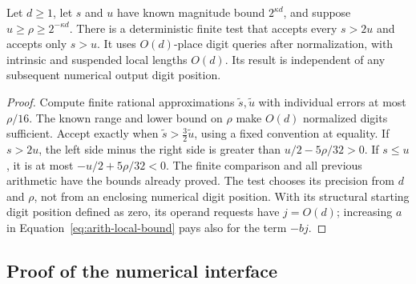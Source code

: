 \begin{lemma}
\label{lem:arith-buffered-test}
Let $d\geq1$, let $s$ and $u$ have known magnitude bound $2^{\kappa d}$,
and suppose $u\geq\rho\geq2^{-\kappa d}$.  There is a deterministic
finite test that accepts every $s>2u$ and accepts only $s>u$.
It uses $O(d)$-place digit queries after normalization, with
intrinsic and suspended local lengths $O(d)$.  Its result is
independent of any subsequent numerical output digit position.
\end{lemma}

\begin{proof}
Compute finite rational approximations $\widetilde s,\widetilde u$
with individual errors at most $\rho/16$.  The known range and
lower bound on $\rho$ make $O(d)$ normalized digits sufficient.
Accept exactly when
$\widetilde s>\tfrac32\widetilde u$, using a fixed convention
at equality.  If $s>2u$, the left side minus the right side is
greater than $u/2-5\rho/32>0$.  If $s\leq u$, it is at most
$-u/2+5\rho/32<0$.  The finite comparison and all previous
arithmetic have the bounds already proved.  The test chooses its
precision from $d$ and $\rho$, not from an enclosing numerical
digit position.  With its structural starting digit position defined as zero, its
operand requests have $j=O(d)$; increasing $a$ in
Equation~\eqref{eq:arith-local-bound} pays also for the term $-bj$.
\end{proof}

\subsection{Proof of the numerical interface}
\label{subsec:arith-interface-proof}

